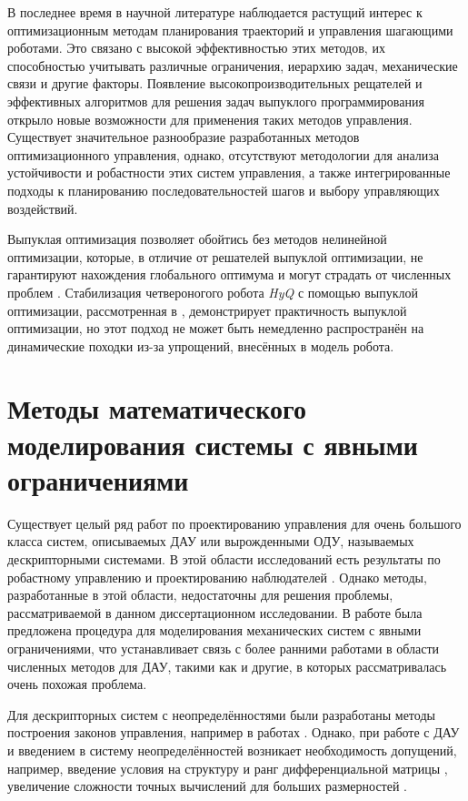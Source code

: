В последнее время в научной литературе наблюдается растущий интерес к оптимизационным методам планирования траекторий и управления шагающими роботами. Это связано с высокой эффективностью этих методов, их способностью учитывать различные ограничения, иерархию задач, механические связи и другие факторы. Появление высокопроизводительных рещателей и эффективных алгоритмов для решения задач выпуклого программирования открыло новые возможности для применения таких методов управления. Существует значительное разнообразие разработанных методов оптимизационного управления, однако, отсутствуют методологии для анализа устойчивости и робастности этих систем управления, а также интегрированные подходы к планированию последовательностей шагов и выбору управляющих воздействий.

Выпуклая оптимизация позволяет обойтись без методов нелинейной оптимизации, которые, в отличие от решателей выпуклой оптимизации, не гарантируют нахождения глобального оптимума и могут страдать от численных проблем \cite{boyd2004convex}. Стабилизация четвероногого робота \textit{HyQ} с помощью выпуклой оптимизации, рассмотренная в \cite{Focchi2016}, демонстрирует практичность выпуклой оптимизации, но этот подход не может быть немедленно распространён на динамические походки из-за  упрощений, внесённых в модель робота.

\section{Методы математического моделирования системы с явными ограничениями}\label{sec:ch1/sec3}

Существует целый ряд работ по проектированию управления для очень большого класса систем, описываемых ДАУ или вырожденными ОДУ, называемых дескрипторными системами. В этой области исследований есть результаты по робастному управлению и проектированию наблюдателей \cite{Cheng2018, Darouach2014}. Однако методы, разработанные в этой области, недостаточны для решения проблемы, рассматриваемой в данном диссертационном исследовании. В работе \cite{Aghili2003} была предложена процедура для моделирования механических систем с явными ограничениями, что устанавливает связь с более ранними работами в области численных методов для ДАУ, такими как \cite{Liang1987} и другие, в которых рассматривалась очень похожая проблема. 

Для дескрипторных систем с неопределённостями были разработаны методы построения законов управления, например в работах \cite{Darouach2014, LIN19993319}. Однако, при работе с ДАУ и введением в систему неопределённостей возникает необходимость допущений, например, введение условия на структуру и ранг дифференциальной матрицы \cite{Cheng2017}, увеличение сложности точных вычислений для больших размерностей \cite{Zhang2006}. 

